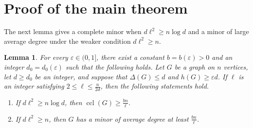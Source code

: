 \documentclass[11pt,a4paper]{article}
\newtheorem{lemma}[theorem]{Lemma}
\theoremstyle{definition}
\theoremstyle{remark}
\DeclareMathOperator{\ccl}{ccl}
\newcommand{\eps}{\varepsilon}
\begin{document}
\section{Proof of the main theorem}
\label{sec:main-proof}


The next lemma gives
a complete minor when $d\ell^2\ge n\log d$ and a minor of large
average degree under the weaker condition $d\ell^2\ge n$.



\begin{lemma}\label{lem:scale}
For every $\eps\in(0,1]$, there exist a constant $b=b(\eps)>0$ and an
integer $d_0=d_0(\eps)$ such that the following holds. Let $G$ be a
graph on $n$ vertices, let $d\ge d_0$ be an integer, and suppose that
$\Delta(G)\le d$ and $h(G)\ge\eps d$. If $\ell$ is an integer
satisfying $2\le\ell\le\frac{n}{2d}$, then the following statements hold.
\begin{enumerate}[label=\textup{(\roman*)}]
 \item If $d\ell^2\ge n\log d$, then
       $\ccl(G)\ge\frac{bn}{\ell}$.
 \item If $d\ell^2\ge n$, then $G$ has a minor of average degree at
       least $\frac{bn}{\ell}$.
\end{enumerate}
\end{lemma}
\end{document}
